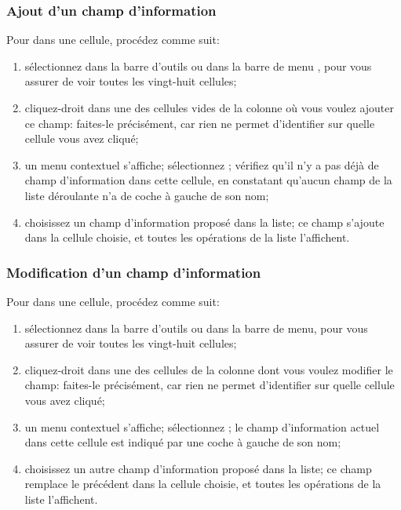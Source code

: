 \subsubsection{Ajout d'un champ d'information\label{transactions-list-fields-add}}

Pour  dans une cellule, procédez comme suit:

\begin{enumerate}
	\item sélectionnez dans la barre d'outils  ou dans la barre de menu , pour vous assurer de voir toutes les vingt-huit cellules;
	\item cliquez-droit dans une des cellules vides de la colonne où vous voulez ajouter ce champ: faites-le précisément, car rien ne permet d'identifier sur quelle cellule vous avez cliqué;
	\item un menu contextuel s'affiche; sélectionnez ; vérifiez qu'il n'y a pas déjà de champ d'information dans cette cellule, en constatant qu'aucun champ de la liste déroulante n'a de coche à gauche de son nom;
	\item choisissez un champ d'information proposé dans la liste; ce champ s'ajoute dans la cellule choisie, et toutes les opérations de la liste l'affichent.
\end{enumerate}


\subsubsection{Modification d'un champ d'information\label{transactions-list-fields-modify}}

Pour  dans une cellule, procédez comme suit:

\begin{enumerate}
	\item sélectionnez  dans la barre d'outils ou  dans la barre de menu, pour vous assurer de voir toutes les vingt-huit cellules;
	\item cliquez-droit dans une des cellules de la colonne dont vous voulez modifier le champ: faites-le précisément, car rien ne permet d'identifier sur quelle cellule vous avez cliqué;
	\item un menu contextuel s'affiche; sélectionnez ; le champ d'information actuel dans cette cellule est indiqué par une coche à gauche de son nom;
	\item choisissez un autre champ d'information proposé dans la liste; ce champ remplace le précédent dans la cellule choisie, et toutes les opérations de la liste l'affichent.
\end{enumerate}


